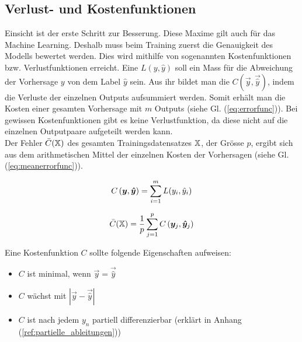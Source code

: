 \subsection{Verlust- und Kostenfunktionen}
Einsicht ist der erste Schritt zur Besserung. Diese Maxime gilt auch für das
Machine Learning.
Deshalb muss beim Training zuerst die Genauigkeit des Modells bewertet werden.
Dies wird mithilfe von sogenannten Kostenfunktionen bzw. Verlustfunktionen erreicht.
\para{}
Eine  $L(y,\hat{y})$ soll ein Mass für die
Abweichung der Vorhersage $y$ von dem Label $\hat{y}$ sein.
Aus ihr bildet man die  $C(\vec{y},\vec{\hat{y}})$, indem die
Verluste der einzelnen Outputs aufsummiert werden. Somit erhält man die Kosten
einer gesamten Vorhersage mit $m$ Outputs (siehe Gl. (\ref{eq:errorfunc})). Bei
gewissen Kostenfunktionen gibt es keine Verlustfunktion, da diese nicht auf die
einzelnen Outputpaare aufgeteilt werden kann. \\
Der Fehler $\bar{C}(\mathbb{X})$ des gesamten Trainingsdatensatzes $\mathbb{X}$, der
Grösse $p$, ergibt sich aus dem arithmetischen Mittel der einzelnen Kosten der
Vorhersagen (siehe Gl. (\ref{eq:meanerrorfunc})).
\\
\begin{minipage}[h!]{0.5\textwidth}
  \begin{equation}\label{eq:errorfunc}
    C \left(\bm{y},\bm{\hat{y}} \right) = \displaystyle\sum_{i=1}^{m} L(y_i, \hat{y}_i)
  \end{equation}
\end{minipage}
\begin{minipage}[h!]{0.5\textwidth}
  \begin{equation}\label{eq:meanerrorfunc}
    \bar{C}(\mathbb{X}) = \frac{1}{p}\displaystyle\sum_{j=1}^{p} C\left(\bm{y}_j,\bm{\hat{y}}_j\right)
  \end{equation}
\end{minipage}
\para{}
Eine Kostenfunktion $C$ sollte folgende Eigenschaften aufweisen:
\begin{itemize}
\item{$C$ ist minimal, wenn $\vec{y} = \vec{\hat{y}}$}
\item{$C$ wächst mit $|\vec{y} - \vec{\hat{y}}|$}
\item{$C$ ist nach jedem $y_n$ partiell differenzierbar (erklärt in Anhang (\ref{ref:partielle_ableitungen}))}
\end{itemize}
\para{}

\cite{Nielsen}

